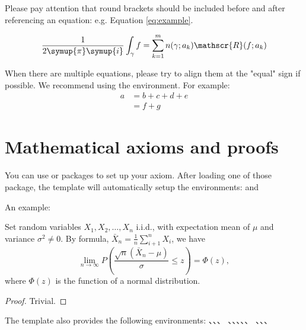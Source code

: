 Please pay attention that round brackets should be included before and after referencing an equation: e.g. Equation \eqref{eq:example}.

\begin{equation}
  \frac{1}{2 \symup{\pi} \symup{i}} \int_\gamma f = \sum_{k=1}^m n(\gamma; a_k) \mathscr{R}(f; a_k)
  \label{eq:example}
\end{equation}

When there are multiple equations, please try to align them at the "equal" sign if possible. We recommend using the  environment.
For example:
\begin{align}
  a & = b + c + d + e \\
    & = f + g
\end{align}


\section{Mathematical axioms and proofs}

You can use  or  packages to set up your axiom. After loading one of those package, the template will automatically setup the environments:  and 

An example:
\begin{theorem}
  Set random variables $X_1, X_2, \dots, X_n$ i.i.d., with expectation mean of $\mu$ and variance $\sigma^2 \ne 0$. By formula, $\bar{X}_n = \frac{1}{n} \sum_{i+1}^n X_i$, we have
  \begin{equation}
    \lim_{n \to \infty} P \left(\frac{\sqrt{n} \left( \bar{X}_n - \mu \right)}{\sigma} \le z \right) = \Phi(z),
  \end{equation}
  where $\Phi(z)$ is the function of a normal distribution.
\end{theorem}
\begin{proof}
  Trivial.
\end{proof}

The template also provides the following environments: 、、、
、、、、、
、、、 